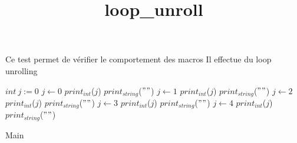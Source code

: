 \documentclass[8pt]{article}
\title{loop\_unroll}
\begin{document}
\maketitle

Ce test permet de v\'erifier le comportement des macros
Il effectue du loop unrolling


\begin{algorithm}[H]
$int\:j := 0$\;
$j \leftarrow 0 $\;
$print_{int}$($ j $)\;
$print_{string}$($ "
" $)\;
$j \leftarrow 1 $\;
$print_{int}$($ j $)\;
$print_{string}$($ "
" $)\;
$j \leftarrow 2 $\;
$print_{int}$($ j $)\;
$print_{string}$($ "
" $)\;
$j \leftarrow 3 $\;
$print_{int}$($ j $)\;
$print_{string}$($ "
" $)\;
$j \leftarrow 4 $\;
$print_{int}$($ j $)\;
$print_{string}$($ "
" $)\;
\caption{Main}
\end{algorithm}
\end{document}
